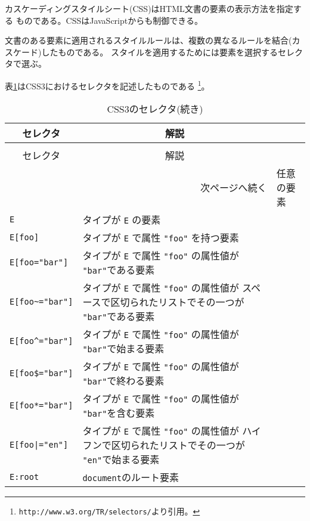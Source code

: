 カスケーディングスタイルシート(CSS)はHTML文書の要素の表示方法を指定する
ものである。CSSはJavaScriptからも制御できる。

文書のある要素に適用されるスタイルルールは、複数の異なるルールを結合(カ
スケード)したものである。
スタイルを適用するためには要素を選択するセレクタで選ぶ。

表\ref{CSS3selector}はCSS3におけるセレクタを記述したものである
\footnote{\protect\texttt{http://www.w3.org/TR/selectors/}より引用。}。
\begin{longtable}{|m{13em}|m{}|}
 \caption{CSS3のセレクタ}\label{CSS3selector}\\
\hline
\multicolumn{1}{|c|}{セレクタ}&\multicolumn{1}{c|}{解説}\\\hline
\endfirsthead
 \caption{CSS3のセレクタ(続き)}\\
\hline
\multicolumn{1}{|c|}{セレクタ}&\multicolumn{1}{c|}{解説}\\\hline
\endhead
\hline\multicolumn{2}{r}{次ページへ続く}
\endfoot
\hline
\endlastfoot
\Verb+*+&任意の要素%
\\\hline
\Verb+E+&タイプが \Verb+E+ の要素%
\\\hline
\Verb+E[foo]+&タイプが \Verb+E+ で属性 \Verb+"foo"+ を持つ要素%
\\\hline
\Verb+E[foo="bar"]+&タイプが \Verb+E+ で属性 \Verb+"foo"+ の属性値が
     \Verb+"bar"+である要素%
\\\hline
\Verb+E[foo~="bar"]+&タイプが \Verb+E+ で属性 \Verb+"foo"+ の属性値が
     スペースで区切られたリストでその一つが \Verb+"bar"+である要素%
\\\hline
\Verb+E[foo^="bar"]+&タイプが \Verb+E+ で属性 \Verb+"foo"+ の属性値が
     \Verb+"bar"+で始まる要素
\\\hline
\Verb+E[foo$="bar"]+&タイプが \Verb+E+ で属性 \Verb+"foo"+ の属性値が
     \Verb+"bar"+で終わる要素%
\\\hline
\Verb+E[foo*="bar"]+&タイプが \Verb+E+ で属性 \Verb+"foo"+ の属性値が
     \Verb+"bar"+を含む要素%
\\\hline
\verb+E[foo|="en"]+&タイプが \Verb+E+ で属性 \Verb+"foo"+ の属性値が
     ハイフンで区切られたリストでその一つが \Verb+"en"+で始まる要素
\\\hline
\Verb+E:root+&\texttt{document}のルート要素%
\\\hline

\end{longtable}

